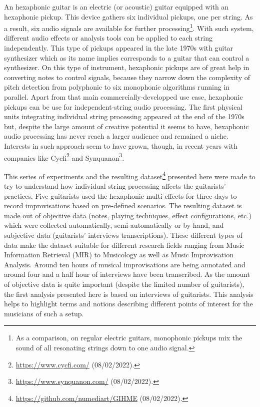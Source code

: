 \documentclass{article}
\begin{document}
An hexaphonic guitar is an electric (or acoustic) guitar equipped with an hexaphonic pickup. This device gathers six individual pickups, one per string. As a result, six audio signals are available for further processing\footnote{As a comparison, on regular electric guitars, monophonic pickups mix the sound of all resonating strings down to one audio signal. }. With such system, different audio effects or analysis tools can be applied to each string independently. This type of pickups appeared in the late 1970s with guitar synthesizer which as its name implies corresponds to a guitar that can control a synthesizer. On this type of instrument, hexaphonic pickups are of great help in converting notes to control signals, because they narrow down the complexity of pitch detection from polyphonic to six monophonic algorithms running in parallel. Apart from that main commercially-developped use case, hexaphonic pickups can be use for independent-string audio processing. The first physical units integrating individual string processing appeared at the end of the 1970s 
but, despite the large amount of creative potential it seems to have, hexaphonic audio processing has never reach a larger audience and remained a niche.  Interests in such approach seem to have grown, though, in recent years with companies like Cycfi\footnote{\url{https://www.cycfi.com/} (08/02/2022).} and Synquanon\footnote{\url{https://www.synquanon.com/} (08/02/2022).}.

This series of experiments and the resulting dataset\footnote{\url{https://github.com/numediart/GIHME} (08/02/2022).} presented here were made to try to understand how individual string processing affects the guitarists' practices.  Five guitarists used the hexaphonic multi-effects for three days to record improvisations based on pre-defined scenarios.
The resulting dataset is made out of objective data (notes, playing techniques, effect configurations, etc.) which were collected automatically, semi-automatically or by hand, and subjective data (guitarists' interviews transcriptions).  These different types of data make the dataset suitable for different research fields ranging from Music Information Retrieval (MIR) to Musicology as well as Music Improvisation Analysis. Around ten hours of musical improvisations are being annotated and around four and a half hour of interviews have been transcribed. As the amount of objective data is quite important (despite the limited number of guitarists), the first analysis presented here is based on interviews of guitarists. This analysis helps to highlight terms and notions describing different points of interest for the musicians of such a setup. 
\end{document}
